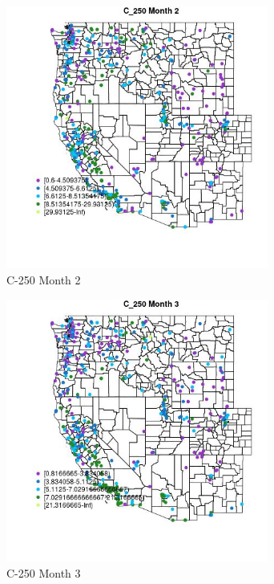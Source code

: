 \begin{figure} 
\centering  
\includegraphics[width=0.77\textwidth]{Code_Outputs/ML_input_report_ML_input_PM25_Step5_part_d_de_duplicated_aves_ML_input_MapObsMo2C_250.jpg} 
\caption{\label{fig:ML_input_report_ML_input_PM25_Step5_part_d_de_duplicated_aves_ML_inputMapObsMo2C_250}C-250 Month 2} 
\end{figure} 
 

\begin{figure} 
\centering  
\includegraphics[width=0.77\textwidth]{Code_Outputs/ML_input_report_ML_input_PM25_Step5_part_d_de_duplicated_aves_ML_input_MapObsMo3C_250.jpg} 
\caption{\label{fig:ML_input_report_ML_input_PM25_Step5_part_d_de_duplicated_aves_ML_inputMapObsMo3C_250}C-250 Month 3} 
\end{figure} 
 


